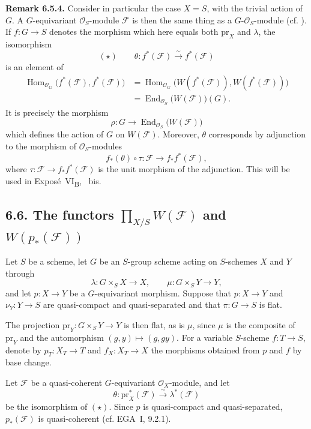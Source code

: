 \medskip
\noindent{}\textbf{Remark 6.5.4.}
Consider in particular the case \(X=S\), with the trivial action of
\(G\). A \(G\)-equivariant \(\mathcal O_S\)-module \(\mathcal F\) is
then the same thing as a \(G\)-\(\mathcal O_S\)-module (cf. ).
If \(f:G\to S\) denotes the morphism which here equals both
\(\mathrm{pr}_X\) and \(\lambda\), the isomorphism
\[
  (\star)\qquad
  \theta:f^*(\mathcal F)\xrightarrow{\ \sim\ }f^*(\mathcal F)
\]
is an element of
\[
\begin{aligned}
  \operatorname{Hom}_{\mathcal O_G}
    \bigl(f^*(\mathcal F),f^*(\mathcal F)\bigr)
  &=
  \operatorname{Hom}_{\mathcal O_G}
    \bigl(W(f^*(\mathcal F)),W(f^*(\mathcal F))\bigr)\\
  &=
  \operatorname{End}_{\mathcal O_S}\bigl(W(\mathcal F)\bigr)(G).
\end{aligned}
\]
It is precisely the morphism
\[
  \rho:G\longrightarrow
  \operatorname{End}_{\mathcal O_S}\bigl(W(\mathcal F)\bigr)
\]
which defines the action of \(G\) on \(W(\mathcal F)\). Moreover,
\(\theta\) corresponds by adjunction to the morphism of
\(\mathcal O_S\)-modules
\[
  f_*(\theta)\circ\tau:
  \mathcal F\longrightarrow f_*f^*(\mathcal F),
\]
where \(\tau:\mathcal F\to f_*f^*(\mathcal F)\) is the unit morphism
of the adjunction. This will be used in Expos\'e~VI\textsubscript{B},
~bis.

\subsection*{6.6. The functors
\(\prod_{X/S}W(\mathcal F)\) and \(W(p_*(\mathcal F))\)}

Let \(S\) be a scheme, let \(G\) be an \(S\)-group scheme acting on
\(S\)-schemes \(X\) and \(Y\) through
\[
  \lambda:G\times_SX\to X,
  \qquad
  \mu:G\times_SY\to Y,
\]
and let \(p:X\to Y\) be a \(G\)-equivariant morphism. Suppose that
\(p:X\to Y\) and \(\nu_Y:Y\to S\) are quasi-compact and
quasi-separated and that \(\pi:G\to S\) is flat.

The projection \(\mathrm{pr}_Y:G\times_SY\to Y\) is then flat, as is
\(\mu\), since \(\mu\) is the composite of \(\mathrm{pr}_Y\) and the
automorphism \((g,y)\mapsto(g,gy)\). For a variable \(S\)-scheme
\(f:T\to S\), denote by \(p_T:X_T\to T\) and \(f_X:X_T\to X\) the
morphisms obtained from \(p\) and \(f\) by base change.

Let \(\mathcal F\) be a quasi-coherent \(G\)-equivariant
\(\mathcal O_X\)-module, and let
\[
  \theta:\mathrm{pr}_X^*(\mathcal F)
  \xrightarrow{\ \sim\ }\lambda^*(\mathcal F)
\]
be the isomorphism of  \((\star)\). Since \(p\) is quasi-compact
and quasi-separated, \(p_*(\mathcal F)\) is quasi-coherent
(cf. EGA~I, 9.2.1).


